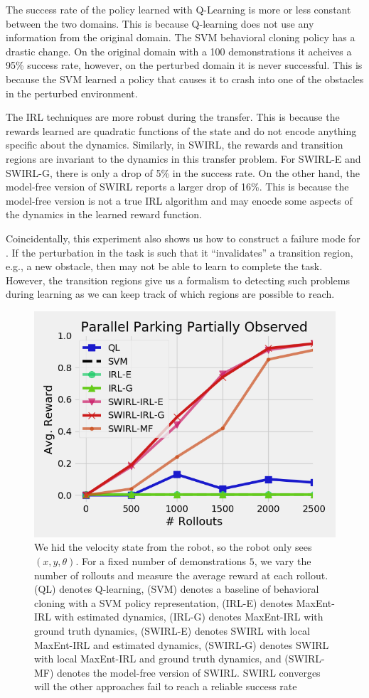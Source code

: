 The success rate of the policy learned with Q-Learning is more or less constant between the two domains.
This is because Q-learning does not use any information from the original domain.
The SVM behavioral cloning policy has a drastic change.
On the original domain with a 100 demonstrations it acheives a 95\% success rate, however, on the perturbed domain it is never successful.
This is because the SVM learned a policy that causes it to crash into one of the obstacles in the perturbed environment.

The IRL techniques are more robust during the transfer.
This is because the rewards learned are quadratic functions of the state and do not encode anything specific about the dynamics.
Similarly, in SWIRL, the rewards and transition regions are invariant to the dynamics in this transfer problem.
For SWIRL-E and SWIRL-G, there is only a drop of 5\% in the success rate.
On the other hand, the model-free version of SWIRL reports a larger drop of 16\%.
This is because the model-free version is not a true IRL algorithm and may enocde some aspects of the dynamics in the learned reward function.

Coincidentally, this experiment also shows us how to construct a failure mode for \hirl.
If the perturbation in the task is such that it ``invalidates'' a transition region, e.g., a new obstacle, then \hirl may not be able to learn to complete the task.
However, the transition regions give us a formalism to detecting such problems during learning as we can keep track of which regions are possible to reach.


\begin{figure}[t]
\centering
 \includegraphics[width=0.8\columnwidth]{new-exp/pp-po.png}
 \caption{We hid the velocity state from the robot, so the robot only sees $(x,y,\theta)$. For a fixed number of demonstrations $5$, we vary the number of rollouts and measure the average reward at each rollout. (QL) denotes Q-learning, (SVM) denotes a baseline of behavioral cloning with a SVM policy representation, (IRL-E) denotes MaxEnt-IRL with estimated dynamics, (IRL-G) denotes MaxEnt-IRL with ground truth dynamics, (SWIRL-E) denotes SWIRL with local MaxEnt-IRL and estimated dynamics, (SWIRL-G) denotes SWIRL with local MaxEnt-IRL and ground truth dynamics, and (SWIRL-MF) denotes the model-free version of SWIRL. SWIRL converges will the other approaches fail to reach a reliable success rate \label{exp:pp-po}}
\end{figure}


